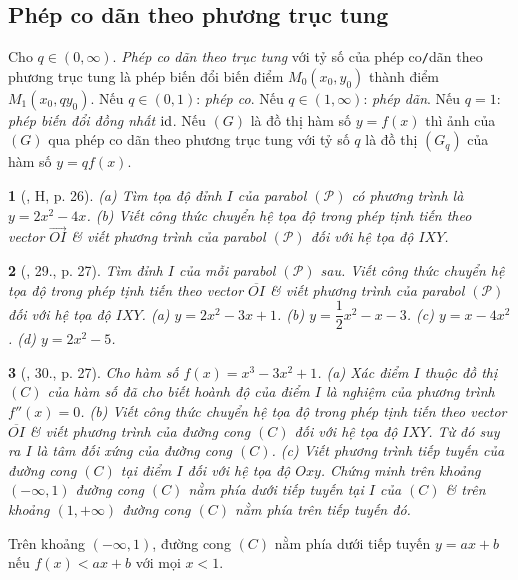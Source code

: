 \documentclass{article}
\newtheorem{baitoan}{}
\begin{document}
\subsection{Phép co dãn theo phương trục tung}
Cho $q\in(0,\infty)$.  {\it Phép co dãn theo trục tung} với tỷ số của phép co{\tt/}dãn theo phương trục tung là phép biến đổi biến điểm $M_0(x_0,y_0)$ thành điểm $M_1(x_0,qy_0)$. Nếu $q\in(0,1)$: {\it phép co}. Nếu $q\in(1,\infty)$: {\it phép dãn}. Nếu $q = 1$: {\it phép biến đổi đồng nhất} $\rm id$.  Nếu $(G)$ là đồ thị hàm số $y = f(x)$ thì ảnh của $(G)$ qua phép co dãn theo phương trục tung với tỷ số $q$ là đồ thị $(G_q)$ của hàm số $y = qf(x)$.

\begin{baitoan}[\cite{SGK_Toan_12_giai_tich_nang_cao}, H, p. 26]
	(a) Tìm tọa độ đỉnh $I$ của parabol $(\mathcal{P})$ có phương trình là $y = 2x^2 - 4x$. (b) Viết công thức chuyển hệ tọa độ trong phép tịnh tiến theo vector $\overrightarrow{OI}$ \& viết phương trình của parabol $(\mathcal{P})$ đối với hệ tọa độ $IXY$.
\end{baitoan}

\begin{baitoan}[\cite{SGK_Toan_12_giai_tich_nang_cao}, 29., p. 27]
	Tìm đỉnh $I$ của mỗi parabol $(\mathcal{P})$ sau. Viết công thức chuyển hệ tọa độ trong phép tịnh tiến theo vector $\overline{OI}$ \& viết phương trình của parabol $(\mathcal{P})$ đối với hệ tọa độ $IXY$. (a) $y = 2x^2 - 3x + 1$. (b) $y = \dfrac{1}{2}x^2 - x - 3$. (c) $y = x - 4x^2$. (d) $y = 2x^2 - 5$.
\end{baitoan}

\begin{baitoan}[\cite{SGK_Toan_12_giai_tich_nang_cao}, 30., p. 27]
	Cho hàm số $f(x) = x^3 - 3x^2 + 1$. (a) Xác điểm $I$ thuộc đồ thị $(C)$ của hàm số đã cho biết hoành độ của điểm $I$ là nghiệm của phương trình $f''(x) = 0$. (b) Viết công thức chuyển hệ tọa độ trong phép tịnh tiến theo vector $\overline{OI}$ \& viết phương trình của đường cong $(C)$ đối với hệ tọa độ $IXY$. Từ đó suy ra $I$ là tâm đối xứng của đường cong $(C)$. (c) Viết phương trình tiếp tuyến của đường cong $(C)$ tại điểm $I$ đối với hệ tọa độ $Oxy$. Chứng minh trên khoảng $(-\infty,1)$ đường cong $(C)$ nằm phía dưới tiếp tuyến tại $I$ của $(C)$ \& trên khoảng $(1,+\infty)$ đường cong $(C)$ nằm phía trên tiếp tuyến đó.
\end{baitoan}
 Trên khoảng $(-\infty,1)$, đường cong $(C)$ nằm phía dưới tiếp tuyến $y = ax + b$ nếu $f(x) < ax + b$ với mọi $x < 1$.
\end{document}
